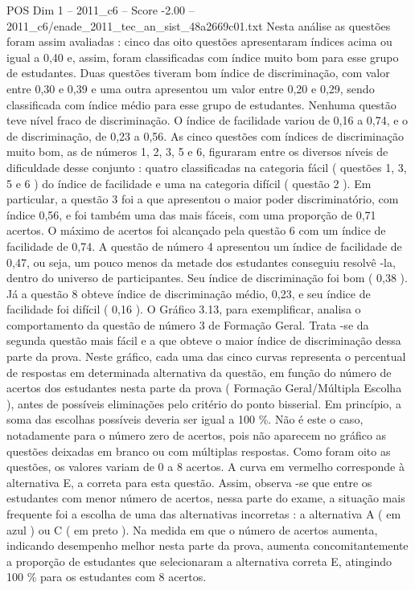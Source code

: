 \begin{textsample}{POS Dim 1 – 2011\_c6 – Score -2.00 – 2011\_c6/enade\_2011\_tec\_an\_sist\_48a2669c01.txt}
Nesta análise as questões foram assim avaliadas : cinco das oito questões apresentaram índices acima ou igual a 0,40 e, assim, foram classificadas com índice muito bom para esse grupo de estudantes.
Duas questões tiveram bom índice de discriminação, com valor entre 0,30 e 0,39 e uma outra apresentou um valor entre 0,20 e 0,29, sendo classificada com índice médio para esse grupo de estudantes.
Nenhuma questão teve nível fraco de discriminação.
O índice de facilidade variou de 0,16 a 0,74, e o de discriminação, de 0,23 a 0,56.
As cinco questões com índices de discriminação muito bom, as de números 1, 2, 3, 5 e 6, figuraram entre os diversos níveis de dificuldade desse conjunto : quatro classificadas na categoria fácil ( questões 1, 3, 5 e 6 ) do índice de facilidade e uma na categoria difícil ( questão 2 ).
Em particular, a questão 3 foi a que apresentou o maior poder discriminatório, com índice 0,56, e foi também uma das mais fáceis, com uma proporção de 0,71 acertos.
O máximo de acertos foi alcançado pela questão 6 com um índice de facilidade de 0,74.
A questão de número 4 apresentou um índice de facilidade de 0,47, ou seja, um pouco menos da metade dos estudantes conseguiu resolvê -la, dentro do universo de participantes.
Seu índice de discriminação foi bom ( 0,38 ).
Já a questão 8 obteve índice de discriminação médio, 0,23, e seu índice de facilidade foi difícil ( 0,16 ).
O Gráfico 3.13, para exemplificar, analisa o comportamento da questão de número 3 de Formação Geral.
Trata -se da segunda questão mais fácil e a que obteve o maior índice de discriminação dessa parte da prova.
Neste gráfico, cada uma das cinco curvas representa o percentual de respostas em determinada alternativa da questão, em função do número de acertos dos estudantes nesta parte da prova ( Formação Geral/Múltipla Escolha ), antes de possíveis eliminações pelo critério do ponto bisserial.
Em princípio, a soma das escolhas possíveis deveria ser igual a 100 \%.
Não é este o caso, notadamente para o número zero de acertos, pois não aparecem no gráfico as questões deixadas em branco ou com múltiplas respostas.
Como foram oito as questões, os valores variam de 0 a 8 acertos.
A curva em vermelho corresponde à alternativa E, a correta para esta questão.
Assim, observa -se que entre os estudantes com menor número de acertos, nessa parte do exame, a situação mais frequente foi a escolha de uma das alternativas incorretas : a alternativa A ( em azul ) ou C ( em preto ).
Na medida em que o número de acertos aumenta, indicando desempenho melhor nesta parte da prova, aumenta concomitantemente a proporção de estudantes que selecionaram a alternativa correta E, atingindo 100 \% para os estudantes com 8 acertos.

\end{textsample}
